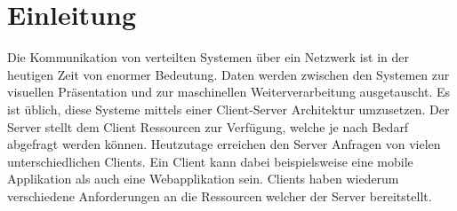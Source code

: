 \chapter{Einleitung}

Die Kommunikation von verteilten Systemen über ein Netzwerk ist in der heutigen Zeit von enormer Bedeutung.
Daten werden zwischen den Systemen zur visuellen Präsentation und zur maschinellen Weiterverarbeitung ausgetauscht.
Es ist üblich, diese Systeme mittels einer Client-Server Architektur umzusetzen.
Der Server stellt dem Client Ressourcen zur Verfügung, welche je nach Bedarf abgefragt werden können.
Heutzutage erreichen den Server Anfragen von vielen unterschiedlichen Clients.
Ein Client kann dabei beispielsweise eine mobile Applikation als auch eine Webapplikation sein.
Clients haben wiederum verschiedene Anforderungen an die Ressourcen welcher der Server bereitstellt. 

